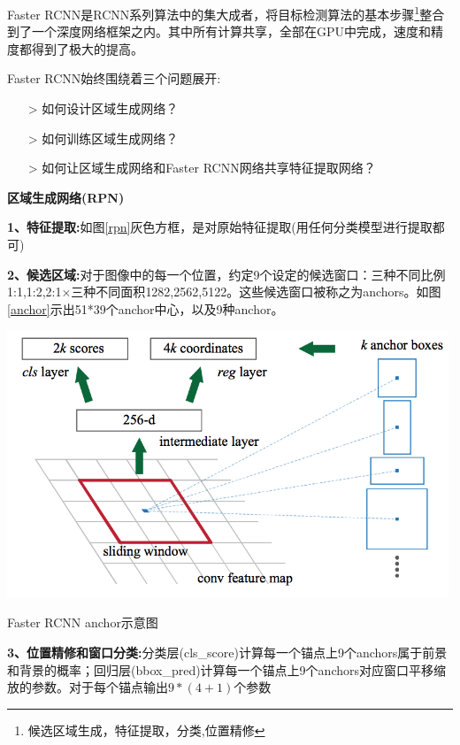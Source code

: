 Faster RCNN是RCNN系列算法中的集大成者，将目标检测算法的基本步骤\footnote{候选区域生成，特征提取，分类,位置精修}整合到了一个深度网络框架之内。其中所有计算共享，全部在GPU中完成，速度和精度都得到了极大的提高。

Faster RCNN始终围绕着三个问题展开:

\line
\begin{itemize}
	\setlength{\itemsep}{0pt}
	\setlength{\parsep}{0pt}
	\setlength{\parskip}{0pt}
	\item[>] 如何设计区域生成网络？
	\item[>] 如何训练区域生成网络？
	\item[>] 如何让区域生成网络和Faster RCNN网络共享特征提取网络？
\end{itemize}
\line

\textbf{区域生成网络(RPN)}

\textbf{1、特征提取:}如图\ref{rpn}灰色方框，是对原始特征提取(用任何分类模型进行提取都可)

\textbf{2、候选区域:}对于图像中的每一个位置，约定9个设定的候选窗口：三种不同比例{1:1,1:2,2:1}×三种不同面积{1282,2562,5122}。这些候选窗口被称之为anchors。如图\ref{anchor}示出51*39个anchor中心，以及9种anchor。
 
\begin{uscfigure}
	\includegraphics[width=\textwidth,height=8cm]{./Pictures/faster_rcnn_anchor.png}	
	\caption{Faster RCNN anchor示意图}	
	\label{anchor}
\end{uscfigure}

\textbf{3、位置精修和窗口分类:}分类层(cls\_score)计算每一个锚点上9个anchors属于前景和背景的概率；回归层(bbox\_pred)计算每一个锚点上9个anchors对应窗口平移缩放的参数。对于每个锚点输出$9*(4+1)$个参数



